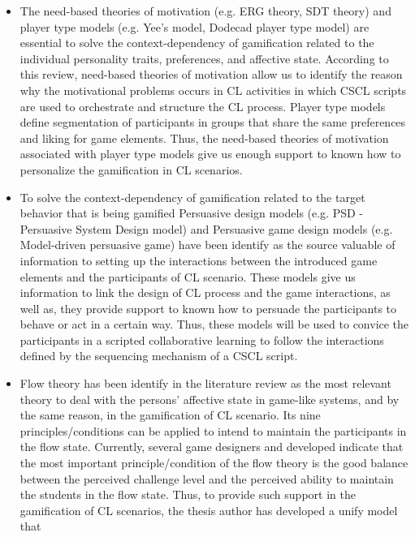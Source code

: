\begin{itemize}
 \item The need-based theories of motivation (e.g. ERG theory, SDT theory) and player type models (e.g. Yee's model, Dodecad player type model) are essential to solve the context-dependency of gamification related to the individual personality traits, preferences, and affective state.
According to this review, need-based theories of motivation allow us to identify the reason why the motivational problems occurs in CL activities in which CSCL scripts are used to orchestrate and structure the CL process.
Player type models define segmentation of participants in groups that share the same preferences and liking for game elements. 
Thus, the need-based theories of motivation associated with player type models give us enough support to known how to personalize the gamification in CL scenarios.

\item To solve the context-dependency of gamification related to the target behavior that is being gamified Persuasive design models (e.g. PSD - Persuasive System Design model) and Persuasive game design models (e.g. Model-driven persuasive game) have been identify as the source valuable of information to setting up the interactions between the introduced game elements and the participants of CL scenario.
These models give us information to link the design of CL process and the game interactions, as well as, they provide support to known how to persuade the participants to behave or act in a certain way. Thus, these models will be used to convice the participants in a scripted collaborative learning to follow the interactions defined by the sequencing mechanism of a CSCL script.

\item Flow theory has been identify in the literature review as the most relevant theory to deal with the persons' affective state in game-like systems, and by the same reason, in the gamification of CL scenario.
Its nine principles/conditions can be applied to intend to maintain the participants in the flow state.
Currently, several game designers and developed indicate that the most important principle/condition of the flow theory is the good balance between the perceived challenge level and the perceived ability to maintain the students in the flow state.
Thus, to provide such support in the gamification of CL scenarios, the thesis author has developed a unify model that
 
\end{itemize}

